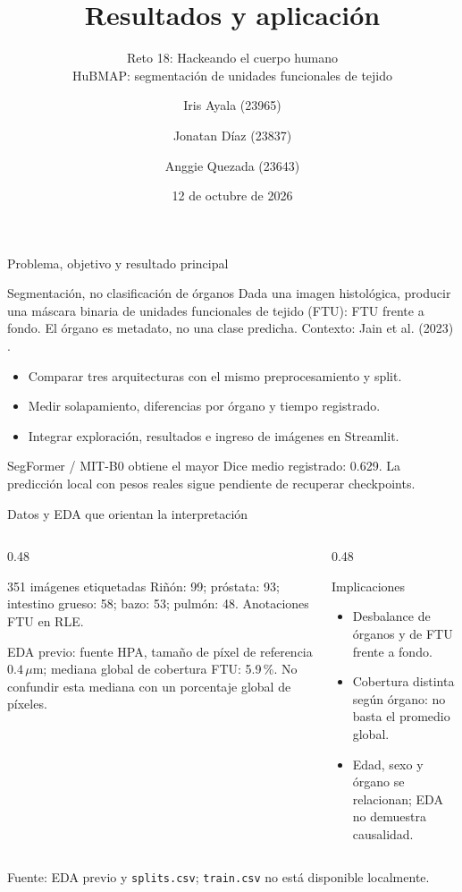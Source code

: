 \documentclass[aspectratio=169,11pt]{beamer}
\title{Resultados y aplicación}
\subtitle{Reto 18: Hackeando el cuerpo humano \\ HuBMAP: segmentación de unidades funcionales de tejido}
\author{Iris Ayala (23965) \and Jonatan Díaz (23837) \and Anggie Quezada (23643)}
\institute{Universidad del Valle de Guatemala \\ CC3084 Data Science, Semestre II, 2026}
\date{12 de octubre de 2026}
\begin{document}
\maketitle

\begin{frame}{Problema, objetivo y resultado principal}
  \begin{block}{Segmentación, no clasificación de órganos}
    Dada una imagen histológica, producir una máscara binaria de unidades
    funcionales de tejido (FTU): FTU frente a fondo. El órgano es metadato,
    no una clase predicha. Contexto: Jain et al. (2023) \cite{jain}.
  \end{block}
  \begin{itemize}
    \item Comparar tres arquitecturas con el mismo preprocesamiento y split.
    \item Medir solapamiento, diferencias por órgano y tiempo registrado.
    \item Integrar exploración, resultados e ingreso de imágenes en Streamlit.
  \end{itemize}
  \alert{SegFormer / MIT-B0 obtiene el mayor Dice medio registrado: 0.629.}
  La predicción local con pesos reales sigue pendiente de recuperar checkpoints.
\end{frame}

\begin{frame}{Datos y EDA que orientan la interpretación}
  \begin{columns}[T]
    \begin{column}{0.48\textwidth}
      \begin{block}{351 imágenes etiquetadas}
        Riñón: 99; próstata: 93; intestino grueso: 58;
        bazo: 53; pulmón: 48. Anotaciones FTU en RLE.
      \end{block}
      \small
      EDA previo: fuente HPA, tamaño de píxel de referencia
      $0.4\,\mu$m; mediana global de cobertura FTU: 5.9\,\%.
      No confundir esta mediana con un porcentaje global de píxeles.
    \end{column}
    \begin{column}{0.48\textwidth}
      \begin{block}{Implicaciones}
        \begin{itemize}
          \item Desbalance de órganos y de FTU frente a fondo.
          \item Cobertura distinta según órgano: no basta el promedio global.
          \item Edad, sexo y órgano se relacionan; EDA no demuestra causalidad.
        \end{itemize}
      \end{block}
    \end{column}
  \end{columns}
  \small Fuente: EDA previo y \texttt{splits.csv}; \texttt{train.csv} no está disponible localmente.
\end{frame}
\end{document}
